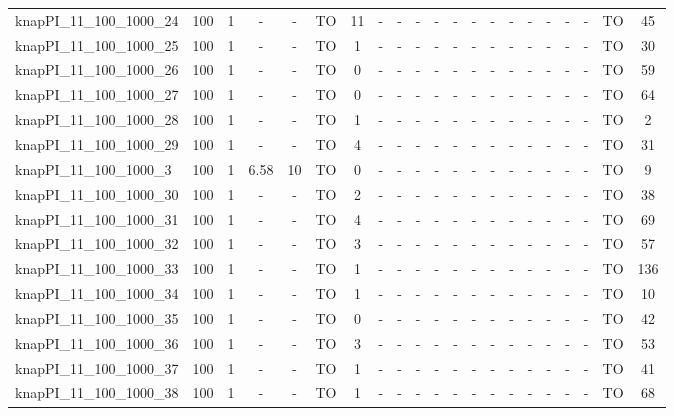 \begin{sidewaystable}[!ht]
{\begin{tabular}{lcccccccccccccccccccc}
knapPI\_11\_100\_1000\_24 & 100 & 1 &  - &  - & TO & 11 &  - &  - &  - &  - &  - &  - &  - &  - &  - &  - &  - &  - & TO & 45 \\
knapPI\_11\_100\_1000\_25 & 100 & 1 &  - &  - & TO & 1 &  - &  - &  - &  - &  - &  - &  - &  - &  - &  - &  - &  - & TO & 30 \\
knapPI\_11\_100\_1000\_26 & 100 & 1 &  - &  - & TO & 0 &  - &  - &  - &  - &  - &  - &  - &  - &  - &  - &  - &  - & TO & 59 \\
knapPI\_11\_100\_1000\_27 & 100 & 1 &  - &  - & TO & 0 &  - &  - &  - &  - &  - &  - &  - &  - &  - &  - &  - &  - & TO & 64 \\
knapPI\_11\_100\_1000\_28 & 100 & 1 &  - &  - & TO & 1 &  - &  - &  - &  - &  - &  - &  - &  - &  - &  - &  - &  - & TO & 2 \\
knapPI\_11\_100\_1000\_29 & 100 & 1 &  - &  - & TO & 4 &  - &  - &  - &  - &  - &  - &  - &  - &  - &  - &  - &  - & TO & 31 \\
knapPI\_11\_100\_1000\_3 & 100 & 1 &  \textcolor{blue2}{6.58} & 10 & TO & 0 &  - &  - &  - &  - &  - &  - &  - &  - &  - &  - &  - &  - & TO & 9 \\
knapPI\_11\_100\_1000\_30 & 100 & 1 &  - &  - & TO & 2 &  - &  - &  - &  - &  - &  - &  - &  - &  - &  - &  - &  - & TO & 38 \\
knapPI\_11\_100\_1000\_31 & 100 & 1 &  - &  - & TO & 4 &  - &  - &  - &  - &  - &  - &  - &  - &  - &  - &  - &  - & TO & 69 \\
knapPI\_11\_100\_1000\_32 & 100 & 1 &  - &  - & TO & 3 &  - &  - &  - &  - &  - &  - &  - &  - &  - &  - &  - &  - & TO & 57 \\
knapPI\_11\_100\_1000\_33 & 100 & 1 &  - &  - & TO & 1 &  - &  - &  - &  - &  - &  - &  - &  - &  - &  - &  - &  - & TO & 136 \\
knapPI\_11\_100\_1000\_34 & 100 & 1 &  - &  - & TO & 1 &  - &  - &  - &  - &  - &  - &  - &  - &  - &  - &  - &  - & TO & 10 \\
knapPI\_11\_100\_1000\_35 & 100 & 1 &  - &  - & TO & 0 &  - &  - &  - &  - &  - &  - &  - &  - &  - &  - &  - &  - & TO & 42 \\
knapPI\_11\_100\_1000\_36 & 100 & 1 &  - &  - & TO & 3 &  - &  - &  - &  - &  - &  - &  - &  - &  - &  - &  - &  - & TO & 53 \\
knapPI\_11\_100\_1000\_37 & 100 & 1 &  - &  - & TO & 1 &  - &  - &  - &  - &  - &  - &  - &  - &  - &  - &  - &  - & TO & 41 \\
knapPI\_11\_100\_1000\_38 & 100 & 1 &  - &  - & TO & 1 &  - &  - &  - &  - &  - &  - &  - &  - &  - &  - &  - &  - & TO & 68 \\

\end{tabular}}
\end{sidewaystable}

